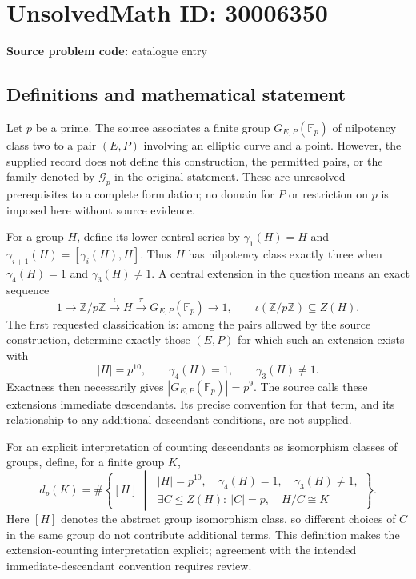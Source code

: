 \documentclass[11pt]{article}
\newcommand{\Z}{\mathbb{Z}}
\newcommand{\F}{\mathbb{F}}
\begin{document}
\section*{UnsolvedMath ID: 30006350}
\textbf{Source problem code:} catalogue entry
\subsection{Definitions and mathematical statement}
Let \(p\) be a prime. The source associates a finite group \(G_{E,P}(\F_p)\) of nilpotency class two to a pair \((E,P)\) involving an elliptic curve and a point. However, the supplied record does not define this construction, the permitted pairs, or the family denoted by \(\mathcal G_p\) in the original statement. These are unresolved prerequisites to a complete formulation; no domain for \(P\) or restriction on \(p\) is imposed here without source evidence.

For a group \(H\), define its lower central series by \(\gamma_1(H)=H\) and \(\gamma_{i+1}(H)=[\gamma_i(H),H]\). Thus \(H\) has nilpotency class exactly three when \(\gamma_4(H)=1\) and \(\gamma_3(H)\ne1\). A central extension in the question means an exact sequence
\[
1\longrightarrow \Z/p\Z\xrightarrow{\iota}H\xrightarrow{\pi}G_{E,P}(\F_p)\longrightarrow1,
\qquad \iota(\Z/p\Z)\subseteq Z(H).
\]
The first requested classification is: among the pairs allowed by the source construction, determine exactly those \((E,P)\) for which such an extension exists with
\[
|H|=p^{10},\qquad \gamma_4(H)=1,\qquad \gamma_3(H)\ne1.
\]
Exactness then necessarily gives \(|G_{E,P}(\F_p)|=p^9\). The source calls these extensions immediate descendants. Its precise convention for that term, and its relationship to any additional descendant conditions, are not supplied.

For an explicit interpretation of counting descendants as isomorphism classes of groups, define, for a finite group \(K\),
\[
d_p(K)=\#\left\{[H]\;\middle|\;
\begin{gathered}
|H|=p^{10},\quad \gamma_4(H)=1,\quad \gamma_3(H)\ne1,\\
\exists C\le Z(H):\ |C|=p,\quad H/C\cong K
\end{gathered}
\right\}.
\]
Here \([H]\) denotes the abstract group isomorphism class, so different choices of \(C\) in the same group do not contribute additional terms. This definition makes the extension-counting interpretation explicit; agreement with the intended immediate-descendant convention requires review.
\end{document}
